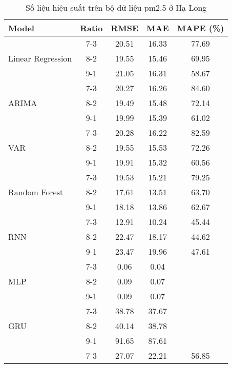 \begin{table}[h!]
    \centering
    \caption{Số liệu hiệu suất trên bộ dữ liệu pm2.5 ở Hạ Long}
    \begin{tabular}{|l|c|c|c|c|}
    \hline
    \rowcolor{orange!30} \textbf{Model} & \textbf{Ratio} & \textbf{RMSE} & \textbf{MAE} & \textbf{MAPE (\%)} \\ \hline
    \rowcolor{white} & 7-3 & 20.51 & 16.33 & 77.69 \\ 
    \rowcolor{white} Linear Regression & 8-2 & 19.55 & 15.46 & 69.95 \\ 
    \rowcolor{white} & 9-1 & 21.05 & 16.31 & 58.67 \\ \hline
    \rowcolor{white} & 7-3 & 20.27 & 16.26 & 84.60 \\ 
    \rowcolor{white} ARIMA & 8-2 & 19.49 & 15.48 & 72.14 \\ 
    \rowcolor{white} & 9-1 & 19.99 & 15.39 & 61.02 \\ \hline
    \rowcolor{white} & 7-3 & 20.28 & 16.22 & 82.59 \\ 
    \rowcolor{white} VAR & 8-2 & 19.55 & 15.53 & 72.26 \\ 
    \rowcolor{white} & 9-1 & 19.91 & 15.32 & 60.56 \\ \hline
    \rowcolor{white} & 7-3 & 19.53 & 15.21 & 79.25 \\ 
    \rowcolor{white} Random Forest & 8-2 & 17.61 & 13.51 & 63.70 \\ 
    \rowcolor{white} & 9-1 & 18.18 & 13.86 & 62.67 \\ \hline
    \rowcolor{white} & 7-3 & 12.91 & 10.24 & 45.44 \\ 
    \rowcolor{white} RNN & 8-2 & 22.47 & 18.17 & 44.62 \\ 
    \rowcolor{white} & 9-1 & 23.47 & 19.96 & 47.61 \\ \hline
    \rowcolor{white} & 7-3 & 0.06 & 0.04 &  \\ 
    \rowcolor{white} MLP & 8-2 & 0.09 & 0.07 &  \\ 
    \rowcolor{white} & 9-1 & 0.09 & 0.07 &  \\ \hline
    \rowcolor{white} & 7-3 & 38.78 & 37.67 &  \\ 
    \rowcolor{white} GRU & 8-2 & 40.14 & 38.78 &  \\ 
    \rowcolor{white} & 9-1 & 91.65 & 87.61 &  \\ \hline
    \rowcolor{white} & 7-3 & 27.07 & 22.21 & 56.85 \\ 

\end{tabular}
\end{table}
